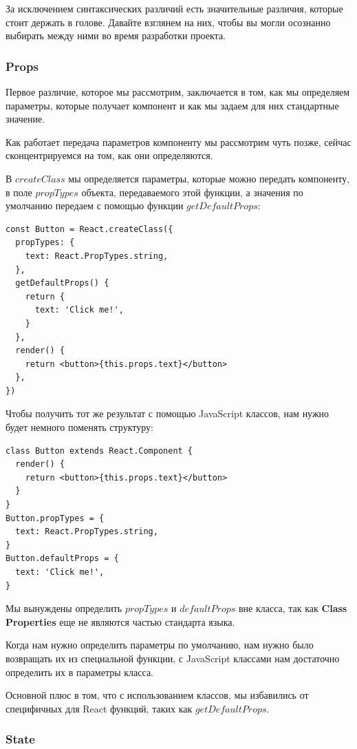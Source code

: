 За исключением синтаксических различий есть значительные различия, которые стоит держать в голове. Давайте взглянем на них, чтобы вы могли осознанно выбирать между ними во время разработки проекта.

\subsubsection*{Props}

Первое различие, которое мы рассмотрим, заключается в том, как мы определяем параметры, которые получает компонент и как мы задаем для них стандартные значение.

Как работает передача параметров компоненту мы рассмотрим чуть позже, сейчас сконцентрируемся на том, как они определяются.

В $createClass$ мы определяется параметры, которые можно передать компоненту, в поле $propTypes$ объекта, передаваемого этой функции, а значения по умолчанию передаем с помощью функции $getDefaultProps$:

\begin{lstlisting}
const Button = React.createClass({
  propTypes: {
    text: React.PropTypes.string,
  },
  getDefaultProps() {
    return {
      text: 'Click me!',
    }
  },
  render() {
    return <button>{this.props.text}</button>
  }, 
})
\end{lstlisting}

Чтобы получить тот же результат с помощью JavaScript классов, нам нужно будет немного поменять структуру:

\begin{lstlisting}
class Button extends React.Component {
  render() {
    return <button>{this.props.text}</button>
  }
}
Button.propTypes = {
  text: React.PropTypes.string,
}
Button.defaultProps = {
  text: 'Click me!',
}
\end{lstlisting}

Мы вынуждены определить $propTypes$ и $defaultProps$ вне класса, так как \textbf{Class Properties} еще не являются частью стандарта языка.

Когда нам нужно определить параметры по умолчанию, нам нужно было возвращать их из специальной функции, с JavaScript классами нам достаточно определить их в параметры класса.

Основной плюс в том, что с использованием классов, мы избавились от специфичных для React функций, таких как $getDefaultProps$.

\subsubsection*{State}

